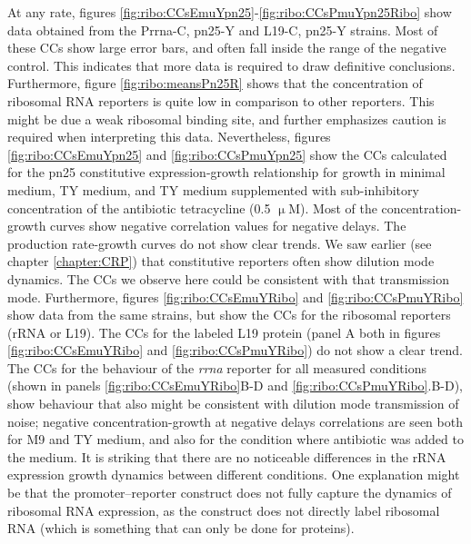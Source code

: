 At any rate, figures \ref{fig:ribo:CCsEmuYpn25}-\ref{fig:ribo:CCsPmuYpn25Ribo} show data obtained from the Prrna-C, pn25-Y and L19-C, pn25-Y strains.
%
Most of these CCs show large error bars, and often fall inside the range of the negative control.
This indicates that more data is required to draw definitive conclusions.
Furthermore, figure \ref{fig:ribo:meansPn25R} shows that the concentration of ribosomal RNA reporters is quite low in comparison to other reporters. This might be due a weak ribosomal binding site, 
and further emphasizes caution is required when interpreting this data.
%
Nevertheless, figures \ref{fig:ribo:CCsEmuYpn25} and \ref{fig:ribo:CCsPmuYpn25} show the CCs calculated for the pn25 constitutive expression-growth relationship for growth in minimal medium, TY medium, and TY medium supplemented with sub-inhibitory concentration of the antibiotic tetracycline (0.5 $\upmu$M).
%
Most of the concentration-growth curves show negative correlation values for negative delays.
The production rate-growth curves do not show clear trends.
We saw earlier (see chapter \ref{chapter:CRP}) that constitutive reporters often show dilution mode dynamics.
The CCs we observe here could be consistent with that transmission mode.
%
Furthermore, figures \ref{fig:ribo:CCsEmuYRibo} and \ref{fig:ribo:CCsPmuYRibo} show data from the same strains, but show the CCs for the ribosomal reporters (rRNA or L19).
The CCs for the labeled L19 protein (panel A both in figures \ref{fig:ribo:CCsEmuYRibo} and \ref{fig:ribo:CCsPmuYRibo}) do not show a clear trend.
The CCs for
the behaviour of the \textit{rrna} reporter for all measured conditions 
(shown in panels \ref{fig:ribo:CCsEmuYRibo}B-D and \ref{fig:ribo:CCsPmuYRibo}.B-D), %
show behaviour that also might be consistent with dilution mode transmission of noise; negative concentration-growth at negative delays correlations are seen both for M9 and TY medium, and also for the condition where antibiotic was added to the medium.
%
It is striking that there are no noticeable differences in the rRNA expression growth dynamics between different conditions.
%
One explanation might be that 
the promoter--reporter construct does not fully capture the dynamics of ribosomal RNA expression, as the construct does not directly label ribosomal RNA (which is something that can only be done for proteins).




